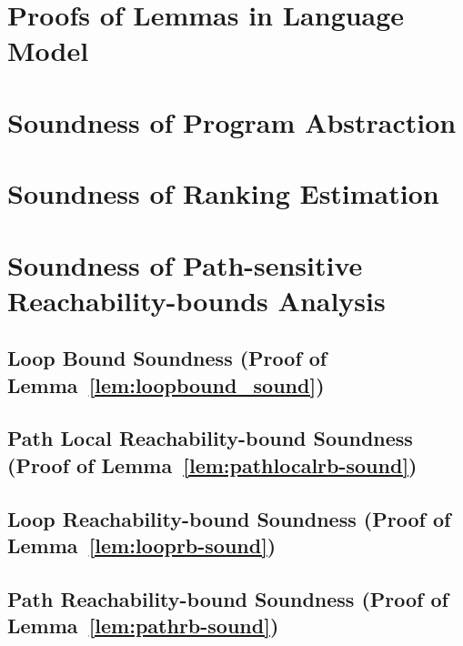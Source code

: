 \section{Proofs of Lemmas in Language Model}
\label{apdx:lem_language}

\clearpage

\section{Soundness of Program Abstraction}
\label{apdx:abs_sound}

\clearpage

\section{Soundness of Ranking Estimation}
\label{apdx:pathinsensitive_rb_soundness}

\clearpage

\section{Soundness of Path-sensitive Reachability-bounds Analysis}
\label{apdx:pathsensitive_rb_soundness}

\subsection{Loop Bound Soundness (Proof of Lemma~\ref{lem:loopbound_sound})}
\label{apdx:loopbound-sound}

\clearpage

\subsection{Path Local Reachability-bound Soundness (Proof of Lemma~\ref{lem:pathlocalrb-sound})}
\label{apdx:pathlocalrb-sound}

\clearpage

\subsection{Loop Reachability-bound Soundness (Proof of Lemma~\ref{lem:looprb-sound})}
\label{apdx:looprb-sound}

\clearpage


\subsection{Path Reachability-bound Soundness (Proof of Lemma~\ref{lem:pathrb-sound})}
\label{apdx:pathrb-sound}

\clearpage

